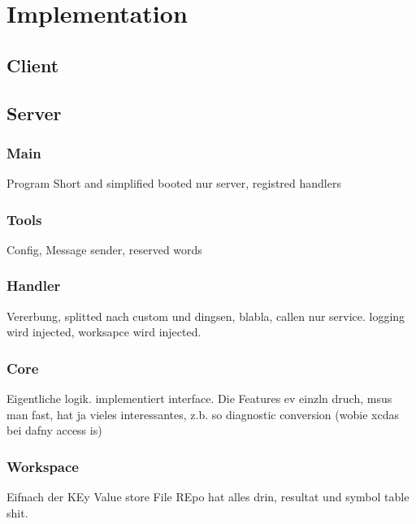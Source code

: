 \section{Implementation}

\subsection{Client}




\subsection{Server}

\subsubsection{Main}
Program Short and simplified
booted nur server, registred handlers

\subsubsection{Tools}
Config, Message sender, reserved words

\subsubsection{Handler}
Vererbung, splitted nach custom und dingsen, blabla, callen nur service.
logging wird injected, worksapce wird injected.

\subsubsection{Core}
Eigentliche logik. implementiert interface. Die Features ev einzln druch, msus man fast, hat ja vieles interessantes, z.b. so diagnostic conversion (wobie xcdas bei dafny access is)

\subsubsection{Workspace}
Eifnach der KEy Value store
File REpo hat alles drin, resultat und symbol table shit.

